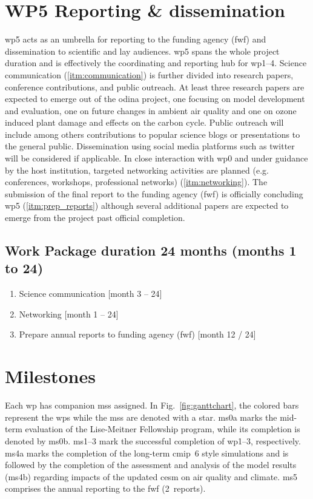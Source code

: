 \section{WP5 Reporting \& dissemination}
\label{sec:wp5}
\gls{wp}5 acts as an umbrella for reporting to the funding agency (\gls{fwf}) and dissemination to scientific and lay audiences. \gls{wp}5 spans the whole project duration and is effectively the coordinating and reporting hub for \gls{wp}1--4. Science communication (\ref{itm:communication}) is further divided into research papers, conference contributions, and public outreach. 
At least three research papers are expected to emerge out of the \gls{odina} project, one focusing on model development and evaluation, one on future changes in ambient air quality and one on ozone induced plant damage and effects on the carbon cycle.
Public outreach will include among others contributions to popular science blogs or presentations to the general public. Dissemination using social media platforms such as twitter will be considered if applicable. In close interaction with \gls{wp}0 and under guidance by the host institution, targeted networking activities are planned (e.g. conferences, workshops, professional networks) (\ref{itm:networking}). The submission of the final report to the funding agency (\gls{fwf}) is officially concluding \gls{wp}5 (\ref{itm:prep_reports}) although several additional papers are expected to emerge from the project past official completion.
{
\subsection*{Work Package duration 24 months (months 1 to 24)}
\begin{enumerate}[start=1,label={T5.\arabic*}]
  \itemsep0pt
\item Science communication \hfill [month 3 -- 24]\label{itm:communication}
\item Networking \hfill [month 1 -- 24]\label{itm:networking}
\item Prepare annual reports to funding agency (\gls{fwf}) \hfill [month 12 / 24]\label{itm:prep_reports}
\end{enumerate}
}

\vspace{0.5\baselineskip}
\section{Milestones}
\label{sec:milestones}
Each \gls{wp} has companion \glspl{ms} assigned. In Fig.~\ref{fig:ganttchart}, the colored bars represent the \glspl{wp} while the \glspl{ms} are denoted with a star. \gls{ms}0a marks the mid-term evaluation of the Lise-Meitner Fellowship program, while its completion is denoted by \gls{ms}0b. \gls{ms}1--3 mark the successful completion of \gls{wp}1--3, respectively. \gls{ms}4a marks the completion of the long-term \gls{cmip}~6 style simulations and is followed by the completion of the assessment and analysis of the model results (\gls{ms}4b) regarding impacts of the updated \gls{cesm} on air quality and climate. \gls{ms}5 comprises the annual reporting to the \gls{fwf} (2~reports).

